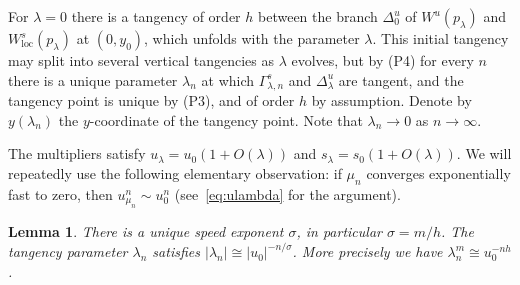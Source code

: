 \documentclass[11pt, oneside]{amsart}
\newcommand{\abs}[1]{\left\vert#1\right\vert}
\newcommand{\loc}{{\mathrm{loc}}}
\newtheorem{lem}[prop] {Lemma}
\theoremstyle{remark}
\theoremstyle{definition}
\theoremstyle{theorem}
\begin{document}
For $\lambda = 0$ there is a tangency of order $h$ between the branch $\Delta^u_0$ of 
$W^u(p_\lambda)$ and $W^s_\loc(p_\lambda)$ at $(0, y_0)$, 
which unfolds with the parameter $\lambda$. 
This   initial     tangency may split into several vertical tangencies as 
$\lambda$ evolves, but by (P4) for every $n$
 there is a unique   parameter $\lambda_n$ at which
  $\Gamma^s_{\lambda, n}$ and $\Delta^u_\lambda$ are tangent, 
and the  tangency point is unique by (P3), and of order $h$ by assumption. 
Denote  by $y(\lambda_n)$ the $y$-coordinate of the tangency point. 
Note that $\lambda_n\to 0$ as $n\to\infty$. 

  

The multipliers satisfy 
 $u_\lambda = u_0(1 + O(\lambda))$ and $s_\lambda = s_0(1+O(\lambda))$.  We will repeatedly use the following elementary
 observation: if $\mu_n$ converges exponentially fast to zero, then 
 $u_{\mu_n}^n\sim u_0^n$ (see~\eqref{eq:ulambda} for the argument). 

  
 

\begin{lem}\label{lem:lambda_n}
There is a unique speed exponent $\sigma$, in particular $\sigma = m/h$. The tangency parameter $\lambda_n$ satisfies 
$\abs{\lambda_n} \cong \abs{u_0}^{-n/\sigma}$. More precisely we have 
$\lambda_n^m \cong u_0^{-nh}$. 

\end{lem}

 
\end{document}
